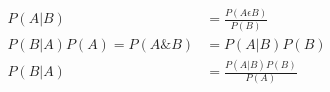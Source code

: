 \documentclass[10pt]{article}
\begin{document}
\begin{align*}P(A|B) & = \frac{P(A \epsilon B)}{P(B)} \\
P(B|A) P(A) = P(A \& B) & = P(A|B) P(B) \\
P(B|A) & = \frac{P(A|B)P(B)}{P(A)}\end{align*}
\end{document}
